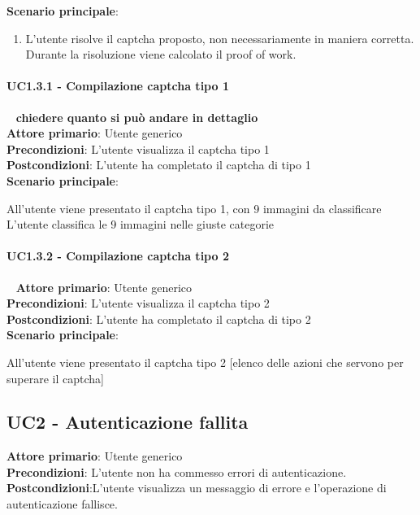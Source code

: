\textbf{Scenario principale}:
\begin{enumerate}
   \item L'utente risolve il captcha proposto, non necessariamente in maniera corretta. Durante la risoluzione viene calcolato il proof of work.
\end{enumerate}

\paragraph{UC1.3.1 - Compilazione captcha tipo 1 }~\smallskip
\textbf{chiedere quanto si può andare in dettaglio}\\
\textbf{Attore primario}: Utente generico\\
\textbf{Precondizioni}: L'utente visualizza il captcha tipo 1\\
\textbf{Postcondizioni}: L'utente ha completato il captcha di tipo 1\\
\textbf{Scenario principale}:

All'utente viene presentato il captcha tipo 1, con 9 immagini da classificare\\
L'utente classifica le 9 immagini nelle giuste categorie


\paragraph{UC1.3.2 - Compilazione captcha tipo 2}~\smallskip
\textbf{Attore primario}: Utente generico\\
\textbf{Precondizioni}: L'utente visualizza il captcha tipo 2\\
\textbf{Postcondizioni}: L'utente ha completato il captcha di tipo 2\\
\textbf{Scenario principale}:

All'utente viene presentato il captcha tipo 2
[elenco delle azioni che servono per superare il captcha]

\subsection{UC2 - Autenticazione fallita}
\textbf{Attore primario}: Utente generico\\
\textbf{Precondizioni}: L’utente non ha commesso errori di autenticazione.\\
\textbf{Postcondizioni}:L’utente visualizza un messaggio di errore e l’operazione di autenticazione fallisce.\\

